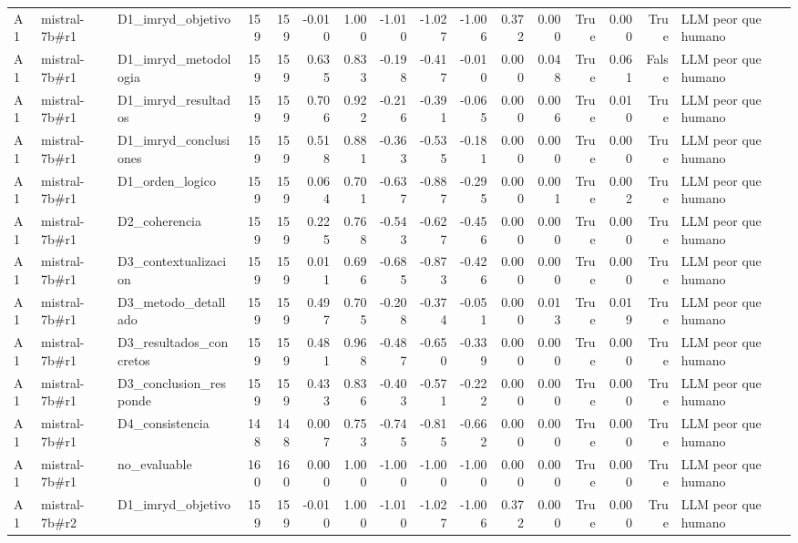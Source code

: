 \begin{table}
{\begin{tabular}{lllrrrrrrrrrrrrl}
A1 & mistral-7b\#r1 & D1\_imryd\_objetivo & 159 & 159 & -0.010 & 1.000 & -1.010 & -1.027 & -1.006 & 0.372 & 0.000 & True & 0.000 & True & LLM peor que humano \\
A1 & mistral-7b\#r1 & D1\_imryd\_metodologia & 159 & 159 & 0.635 & 0.833 & -0.198 & -0.417 & -0.010 & 0.000 & 0.048 & True & 0.061 & False & LLM peor que humano \\
A1 & mistral-7b\#r1 & D1\_imryd\_resultados & 159 & 159 & 0.706 & 0.922 & -0.216 & -0.391 & -0.065 & 0.000 & 0.006 & True & 0.010 & True & LLM peor que humano \\
A1 & mistral-7b\#r1 & D1\_imryd\_conclusiones & 159 & 159 & 0.518 & 0.881 & -0.363 & -0.535 & -0.181 & 0.000 & 0.000 & True & 0.000 & True & LLM peor que humano \\
A1 & mistral-7b\#r1 & D1\_orden\_logico & 159 & 159 & 0.064 & 0.701 & -0.637 & -0.887 & -0.295 & 0.000 & 0.001 & True & 0.002 & True & LLM peor que humano \\
A1 & mistral-7b\#r1 & D2\_coherencia & 159 & 159 & 0.225 & 0.768 & -0.543 & -0.627 & -0.456 & 0.000 & 0.000 & True & 0.000 & True & LLM peor que humano \\
A1 & mistral-7b\#r1 & D3\_contextualizacion & 159 & 159 & 0.011 & 0.696 & -0.685 & -0.873 & -0.426 & 0.000 & 0.000 & True & 0.000 & True & LLM peor que humano \\
A1 & mistral-7b\#r1 & D3\_metodo\_detallado & 159 & 159 & 0.497 & 0.705 & -0.208 & -0.374 & -0.051 & 0.000 & 0.013 & True & 0.019 & True & LLM peor que humano \\
A1 & mistral-7b\#r1 & D3\_resultados\_concretos & 159 & 159 & 0.481 & 0.968 & -0.487 & -0.650 & -0.339 & 0.000 & 0.000 & True & 0.000 & True & LLM peor que humano \\
A1 & mistral-7b\#r1 & D3\_conclusion\_responde & 159 & 159 & 0.433 & 0.836 & -0.403 & -0.571 & -0.222 & 0.000 & 0.000 & True & 0.000 & True & LLM peor que humano \\
A1 & mistral-7b\#r1 & D4\_consistencia & 148 & 148 & 0.007 & 0.753 & -0.745 & -0.815 & -0.662 & 0.000 & 0.000 & True & 0.000 & True & LLM peor que humano \\
A1 & mistral-7b\#r1 & no\_evaluable & 160 & 160 & 0.000 & 1.000 & -1.000 & -1.000 & -1.000 & 0.000 & 0.000 & True & 0.000 & True & LLM peor que humano \\
A1 & mistral-7b\#r2 & D1\_imryd\_objetivo & 159 & 159 & -0.010 & 1.000 & -1.010 & -1.027 & -1.006 & 0.372 & 0.000 & True & 0.000 & True & LLM peor que humano \\

\end{tabular}}
\end{table}
